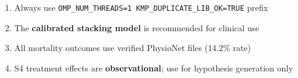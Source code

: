 \documentclass[11pt,a4paper]{article}
\newcommand{\command}[1]{\texttt{\color{primary}#1}}
\begin{document}
\begin{tcolorbox}[
    enhanced,
    colback=warning!5,
    colframe=warning!80!black,
    arc=2mm,
    boxrule=1pt,
]
\begin{enumerate}[leftmargin=*]
    \item Always use \command{OMP\_NUM\_THREADS=1 KMP\_DUPLICATE\_LIB\_OK=TRUE} prefix
    \item The \textbf{calibrated stacking model} is recommended for clinical use
    \item All mortality outcomes use verified PhysioNet files (14.2\% rate)
    \item S4 treatment effects are \textbf{observational}; use for hypothesis generation only
\end{enumerate}
\end{tcolorbox}
\end{document}
